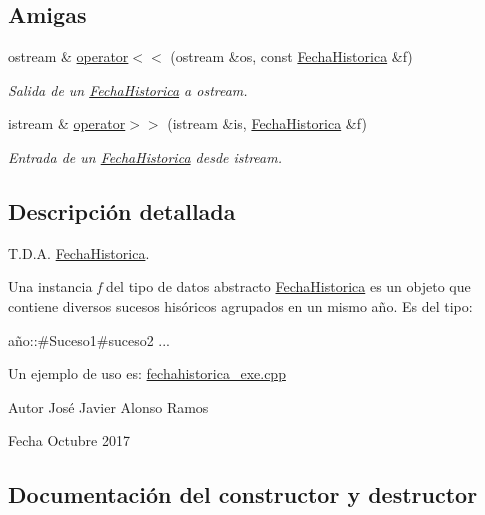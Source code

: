 \subsection*{Amigas}
\begin{DoxyCompactItemize}
\item 
ostream \& \hyperlink{classFechaHistorica_ae7ffc75da1b9b42da839968d57c0dc9c}{operator$<$$<$} (ostream \&os, const \hyperlink{classFechaHistorica}{Fecha\+Historica} \&f)
\begin{DoxyCompactList}\small\item\em Salida de un \hyperlink{classFechaHistorica}{Fecha\+Historica} a ostream. \end{DoxyCompactList}\item 
istream \& \hyperlink{classFechaHistorica_a25a93d162aadd3c52aa1f3d1831e3d75}{operator$>$$>$} (istream \&is, \hyperlink{classFechaHistorica}{Fecha\+Historica} \&f)
\begin{DoxyCompactList}\small\item\em Entrada de un \hyperlink{classFechaHistorica}{Fecha\+Historica} desde istream. \end{DoxyCompactList}\end{DoxyCompactItemize}


\subsection{Descripción detallada}
T.\+D.\+A. \hyperlink{classFechaHistorica}{Fecha\+Historica}. 

Una instancia {\itshape f} del tipo de datos abstracto {\ttfamily \hyperlink{classFechaHistorica}{Fecha\+Historica}} es un objeto que contiene diversos sucesos hisóricos agrupados en un mismo año. Es del tipo\+:

año\+:\+:\#\+Suceso1\#suceso2 ...

Un ejemplo de uso es\+:  \hyperlink{fechahistorica__exe_8cpp}{fechahistorica\+\_\+exe.\+cpp}

\begin{DoxyAuthor}{Autor}
José Javier Alonso Ramos 
\end{DoxyAuthor}
\begin{DoxyDate}{Fecha}
Octubre 2017 
\end{DoxyDate}


\subsection{Documentación del constructor y destructor}
